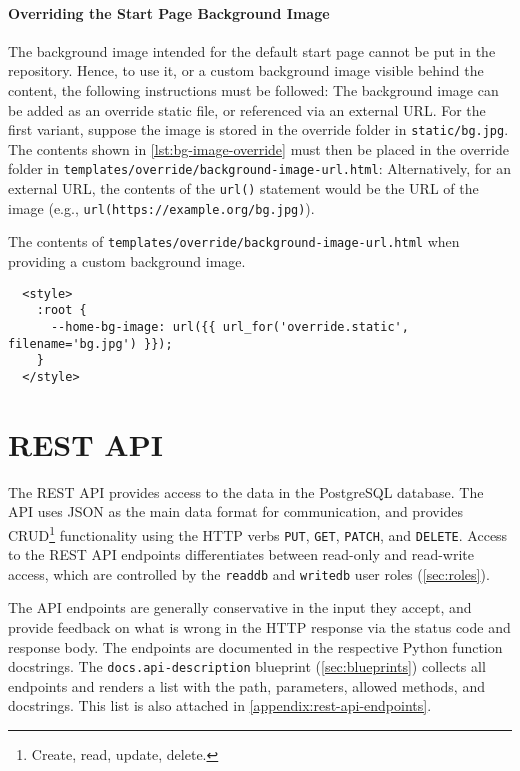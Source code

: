 \paragraph*{Overriding the Start Page Background Image}
\label{par:overriding-start-page-bg-image}
The background image intended for the default start page cannot be put in the repository.
Hence, to use it, or a custom background image visible behind the content, the following instructions must be followed:
The background image can be added as an override static file, or referenced via an external URL.
For the first variant, suppose the image is stored in the override folder in \verb!static/bg.jpg!.
The contents shown in \cref{lst:bg-image-override} must then be placed in the override folder in \verb!templates/override/background-image-url.html!:
Alternatively, for an external URL, the contents of the \verb!url()! statement would be the URL of the image (e.g., \verb!url(https://example.org/bg.jpg)!).

\begin{lstfloat}
  \centering
  \caption{The contents of \texttt{templates/override/background-image-url.html} when providing a custom background image.}
  \label{lst:bg-image-override}

  \begin{lstlisting}
  <style>
    :root {
      --home-bg-image: url({{ url_for('override.static', filename='bg.jpg') }});
    }
  </style>
  \end{lstlisting}
\end{lstfloat}


\section{REST API}
\label{sec:rest-api}

The REST API provides access to the data in the PostgreSQL database.
The API uses JSON as the main data format for communication, and provides CRUD\footnote{Create, read, update, delete.} functionality using the HTTP verbs \verb!PUT!, \verb!GET!, \verb!PATCH!, and \verb!DELETE!.
Access to the REST API endpoints differentiates between read-only and read-write access, which are controlled by the \verb!readdb! and \verb!writedb! user roles (\cref{sec:roles}).

The API endpoints are generally conservative in the input they accept, and provide feedback on what is wrong in the HTTP response via the status code and response body.
The endpoints are documented in the respective Python function docstrings.
The \verb!docs.api-description! blueprint (\cref{sec:blueprints}) collects all endpoints and renders a list with the path, parameters, allowed methods, and docstrings.
This list is also attached in \cref{appendix:rest-api-endpoints}.
